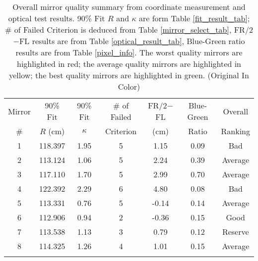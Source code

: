 \documentclass[12pt]{article}
\newcommand{\oic}{(Original In Color)}%
\begin{document}
\begin{table}[t]
\centering
\caption[Overall Mirror Quality Summary]{Overall mirror quality summary from coordinate measurement and optical test results. 90\% Fit $R$ and $\kappa$ are form Table \ref{fit_result_tab}; \# of Failed Criterion is deduced from Table \ref{mirror_select_tab}, FR/2$-$FL results are from Table \ref{optical_result_tab}, Blue-Green ratio results are from Table \ref{pixel_info}. The worst quality mirrors are highlighted in red; the average quality mirrors are highlighted in yellow; the best quality mirrors are highlighted in green. \oic}
\begin{tabular}{ccccccc}
\toprule%
Mirror  & 90\% Fit& 90\% Fit & \# of Failed &  FR/2$-$FL &   Blue-Green  &  Overall \\        
\#	    & $R$ (cm)& $\kappa$ & Criterion    &   (cm)    &    Ratio 	    &  Ranking \\    
\toprule                                                                                 \rowcolor{Salmon}  %
1		& 118.397 &  1.95    & 5            &   1.15    &    0.09	    &  Bad     \\    \rowcolor{GreenYellow}               %
2       & 113.124 &  1.06    & 5            &   2.24    &    0.39       &  Average \\    \rowcolor{GreenYellow}              %
3       & 117.110 &  1.70    & 5            &   2.99    &    0.70       &  Average \\    \rowcolor{Salmon}              %
4       & 122.392 &  2.29    & 6            &   4.80    &    0.08       &  Bad     \\    \rowcolor{GreenYellow}             %
5       & 113.331 &  0.76    & 5            &  -0.14    &    0.14       &  Average \\    \rowcolor{TealBlue}             %
6       & 112.906 &  0.94    & 2            &  -0.36    &    0.15       &  Good    \\    \rowcolor{GreenYellow}             %
7       & 113.538 &  1.13    & 3            &   0.79    &    0.12       &  Reserve \\    \rowcolor{GreenYellow}             %
8       & 114.325 &  1.26    & 4            &   1.01    &    0.15       &  Average \\    \rowcolor{GreenYellow}             %

\end{tabular}
\end{table}
\end{document}
